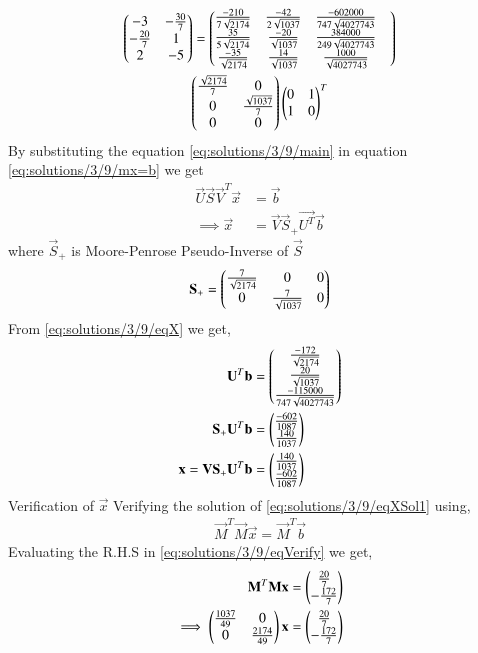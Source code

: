 \begin{multline}
		\begin{pmatrix}-3&-\frac{30}{7} \\-\frac{20}{7} & 1 \\ 2 & -5\end{pmatrix} =
		\begin{pmatrix}\frac{-210}{7\sqrt{2174}} & \frac{-42}{2\sqrt{1037}} & \frac{-602000}{747\sqrt{4027743}} &\\ \frac{35}{5\sqrt{2174}}& \frac{-20}{\sqrt{1037}}&  \frac{384000}{249\sqrt{4027743}} \\
			\frac{-35}{\sqrt{2174}}& \frac{14}{\sqrt{1037}} &   \frac{1000}{\sqrt{4027743}}\end{pmatrix} \\
    	\begin{pmatrix}\frac{\sqrt{2174}}{7} & 0\\ 0 & \frac{\sqrt{1037}}{7} \\ 0 &0\end{pmatrix}
		\begin{pmatrix}0 & 1\\1 & 0\end{pmatrix}^T
\end{multline}
By substituting the equation \eqref{eq:solutions/3/9/main} in equation \eqref{eq:solutions/3/9/mx=b} we get 
\begin{align}
	\vec{U}\vec{S}\vec{V}^T\vec{x} & = \vec{b}\\
	\implies\vec{x} &= \vec{V}\vec{S}_+\vec{U^T}\vec{b} \label{eq:solutions/3/9/eqX}
\end{align}
where $\vec{S}_+$ is Moore-Penrose Pseudo-Inverse of $\vec{S}$
\begin{align}
	\mathbf{S}_+=\begin{pmatrix}\frac{7}{\sqrt{2174}} & 0 & 0 \\ 0 & \frac{7}{\sqrt{1037}} & 0\end{pmatrix}
\end{align}
From \eqref{eq:solutions/3/9/eqX} we get,
\begin{align}
	\mathbf{U}^T\mathbf{b}&=\begin{pmatrix}\frac{-172}{\sqrt{2174}} \\ \frac{20}{\sqrt{1037}} \\ \frac{-115000}{747\sqrt{4027743}}\end{pmatrix}\\ 
	\mathbf{S}_+\mathbf{U}^T\mathbf{b}&=\begin{pmatrix}\frac{-602}{1087} \\ \frac{140}{1037}\end{pmatrix}\\
	\mathbf{x} = \mathbf{V}\mathbf{S}_+\mathbf{U}^T\mathbf{b} &= \begin{pmatrix}\frac{140}{1037} \\ \frac{-602}{1087}\end{pmatrix}\label{eq:solutions/3/9/eqXSol1}
\end{align}
{Verification of $\vec{x}$}
Verifying the solution of \eqref{eq:solutions/3/9/eqXSol1} using,
\begin{align}
	\vec{M}^T\vec{M}\vec{x} = \vec{M}^T\vec{b}\label{eq:solutions/3/9/eqVerify}
\end{align}
Evaluating the R.H.S in \eqref{eq:solutions/3/9/eqVerify} we get,
\begin{align}
	\mathbf{M}^T\mathbf{M}\mathbf{x} &= \begin{pmatrix}\frac{20}{7}\\ - \frac{172}{7}\end{pmatrix}\\
	\implies\begin{pmatrix}\frac{1037}{49} & 0 \\ 0 & \frac{2174}{49}\end{pmatrix}\mathbf{x} &= \begin{pmatrix}\frac{20}{7}\\ -\frac{172}{7}\end{pmatrix}\label{eq:solutions/3/9/eqMateq}
\end{align}
